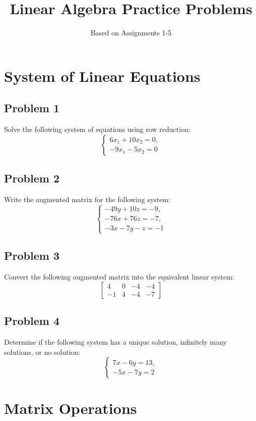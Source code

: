 \documentclass[a4paper, 12pt]{article}
\title{Linear Algebra Practice Problems}
\author{Based on Assignments 1-5}
\date{}
\begin{document}
\maketitle

\section*{System of Linear Equations}

\subsection*{Problem 1}
Solve the following system of equations using row reduction:
\[
\begin{cases}
6x_1 + 10x_2 = 0, \\
-9x_1 - 5x_2 = 0
\end{cases}
\]

\subsection*{Problem 2}
Write the augmented matrix for the following system:
\[
\begin{cases}
-49y + 10z = -9, \\
-76x + 76z = -7, \\
-3x - 7y - z = -1
\end{cases}
\]

\subsection*{Problem 3}
Convert the following augmented matrix into the equivalent linear system:
\[
\begin{bmatrix}
4 & 0 & -4 & -4 \\
-1 & 4 & -4 & -7
\end{bmatrix}
\]

\subsection*{Problem 4}
Determine if the following system has a unique solution, infinitely many solutions, or no solution:
\[
\begin{cases}
7x - 6y = 13, \\
-5x - 7y = 2
\end{cases}
\]

\section*{Matrix Operations}
\end{document}
